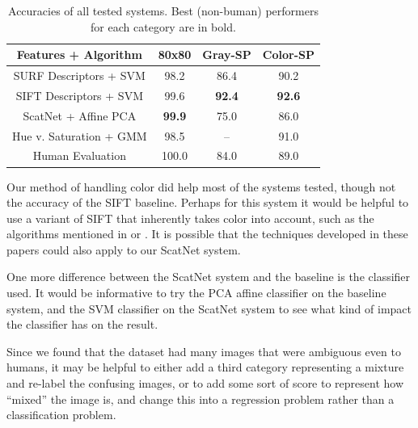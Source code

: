 \documentclass{article}
\begin{document}
\begin{table}
	\begin{tabular}{ c | c c c }
		\multicolumn{1}{c}{Features + Algorithm} & 80x80 & Gray-SP & Color-SP \\ \hline
		SURF Descriptors + SVM & 98.2 & 86.4 & 90.2 \\ 
		SIFT Descriptors + SVM & 99.6 & \textbf{92.4} & \textbf{92.6} \\ 
		ScatNet + Affine PCA & \textbf{99.9} & 75.0 & 86.0 \\ 
		Hue v. Saturation + GMM & 98.5 & -- & 91.0 \\ 
		Human Evaluation & 100.0 & 84.0 & 89.0 \\ 
	\end{tabular}
	\caption{Accuracies of all tested systems. Best (non-buman) performers for
	each category are in bold.}
\end{table}

Our method of handling color did help most of the systems tested, though not
the accuracy of the SIFT baseline. Perhaps for this system it would be helpful
to use a variant of SIFT that inherently takes color into account, such as the algorithms
mentioned in \cite{Fan2009} or \cite{Sande2010}. It is possible that the techniques
developed in these papers could also apply to our ScatNet system. 

One more difference between the ScatNet system and the baseline is the classifier
used. It would be informative to try the PCA affine classifier on the baseline
system, and the SVM classifier on the ScatNet system to see what kind of impact
the classifier has on the result. 

Since we found that the dataset had many images that were ambiguous even to
humans, it may be helpful to either add a third category representing a mixture
and re-label the confusing images, or to add some sort of score to represent how
“mixed” the image is, and change this into a regression problem rather than a
classification problem. 




\end{document}
